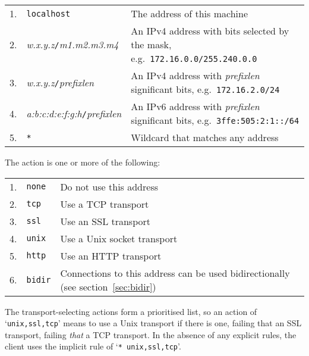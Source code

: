 \documentclass[11pt,oneside,a4paper]{book}
\newcommand{\code}[1]{\texttt{#1}}
\newcommand{\dsc}{\discretionary{}{}{}}
\begin{document}
\begin{tabular}{llp{}}
1. & \code{localhost} & The address of this machine\\

2. & \textit{w.x.y.z}\code{/}\textit{m1.m2.m3.m4} & An IPv4 address
     with bits selected by the mask, e.g.\
     \code{172.16.0.0/255.240.0.0}\\

3. & \textit{w.x.y.z}\code{/}\textit{prefixlen} & An IPv4 address with
     \textit{prefixlen} significant bits, e.g.\
     \code{172.16.2.0/24}\\

4. & \textit{a:b:c:d:e:f:g:h}\code{/}\textit{prefixlen} & An IPv6
     address with \textit{prefixlen} significant bits, e.g.\
     \code{3ffe:505:2:1::/64}\\

5. & \code{*} & Wildcard that matches any address\\
\end{tabular}

\vspace{\baselineskip}

\noindent The action is one or more of the following:

\vspace{\baselineskip}

\begin{tabular}{llp{}}
1. & \code{none} & Do not use this address\\
2. & \code{tcp}  & Use a TCP transport\\
3. & \code{ssl}  & Use an SSL transport\\
4. & \code{unix} & Use a Unix socket transport\\
5. & \code{http} & Use an HTTP transport\\
6. & \code{bidir}& Connections to this address can be used
                   bidirectionally (see section~\ref{sec:bidir})\\
\end{tabular}

\vspace{\baselineskip}

\noindent The transport-selecting actions form a prioritised list, so
an action of `\code{unix,ssl,\dsc{}tcp}' means to use a Unix transport if
there is one, failing that an SSL transport, failing \emph{that} a TCP
transport. In the absence of any explicit rules, the client uses the
implicit rule of `\code{* unix,ssl,tcp}'.
\end{document}
